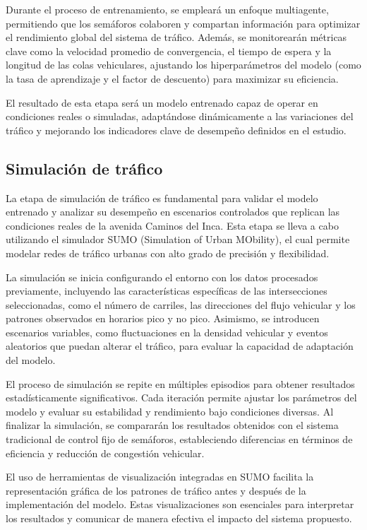 Durante el proceso de entrenamiento, se empleará un enfoque multiagente, permitiendo que los semáforos colaboren y compartan información para optimizar el rendimiento global del sistema de tráfico. Además, se monitorearán métricas clave como la velocidad promedio de convergencia, el tiempo de espera y la longitud de las colas vehiculares, ajustando los hiperparámetros del modelo (como la tasa de aprendizaje y el factor de descuento) para maximizar su eficiencia.

El resultado de esta etapa será un modelo entrenado capaz de operar en condiciones reales o simuladas, adaptándose dinámicamente a las variaciones del tráfico y mejorando los indicadores clave de desempeño definidos en el estudio.

\subsection{Simulación de tráfico}

La etapa de simulación de tráfico es fundamental para validar el modelo entrenado y analizar su desempeño en escenarios controlados que replican las condiciones reales de la avenida Caminos del Inca. Esta etapa se lleva a cabo utilizando el simulador SUMO (Simulation of Urban MObility), el cual permite modelar redes de tráfico urbanas con alto grado de precisión y flexibilidad.

La simulación se inicia configurando el entorno con los datos procesados previamente, incluyendo las características específicas de las intersecciones seleccionadas, como el número de carriles, las direcciones del flujo vehicular y los patrones observados en horarios pico y no pico. Asimismo, se introducen escenarios variables, como fluctuaciones en la densidad vehicular y eventos aleatorios que puedan alterar el tráfico, para evaluar la capacidad de adaptación del modelo.

El proceso de simulación se repite en múltiples episodios para obtener resultados estadísticamente significativos. Cada iteración permite ajustar los parámetros del modelo y evaluar su estabilidad y rendimiento bajo condiciones diversas. Al finalizar la simulación, se compararán los resultados obtenidos con el sistema tradicional de control fijo de semáforos, estableciendo diferencias en términos de eficiencia y reducción de congestión vehicular.

El uso de herramientas de visualización integradas en SUMO facilita la representación gráfica de los patrones de tráfico antes y después de la implementación del modelo. Estas visualizaciones son esenciales para interpretar los resultados y comunicar de manera efectiva el impacto del sistema propuesto.

